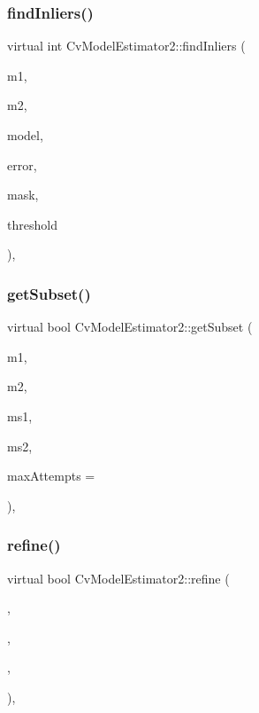 \subsubsection{find\+Inliers()}
{\footnotesize\ttfamily virtual int Cv\+Model\+Estimator2\+::find\+Inliers (\begin{DoxyParamCaption}\item[{const Cv\+Mat $\ast$}]{m1,  }\item[{const Cv\+Mat $\ast$}]{m2,  }\item[{const Cv\+Mat $\ast$}]{model,  }\item[{Cv\+Mat $\ast$}]{error,  }\item[{Cv\+Mat $\ast$}]{mask,  }\item[{double}]{threshold }\end{DoxyParamCaption})\hspace{0.3cm}{\ttfamily [protected]}, {\ttfamily [virtual]}}

\mbox{\label{class_cv_model_estimator2_a8a1749e60a02a5cb697425bd2daa35af}} 
\subsubsection{get\+Subset()}
{\footnotesize\ttfamily virtual bool Cv\+Model\+Estimator2\+::get\+Subset (\begin{DoxyParamCaption}\item[{const Cv\+Mat $\ast$}]{m1,  }\item[{const Cv\+Mat $\ast$}]{m2,  }\item[{Cv\+Mat $\ast$}]{ms1,  }\item[{Cv\+Mat $\ast$}]{ms2,  }\item[{int}]{max\+Attempts = {} }\end{DoxyParamCaption})\hspace{0.3cm}{\ttfamily [protected]}, {\ttfamily [virtual]}}

\mbox{\label{class_cv_model_estimator2_a760edefe34027333ccc6c19e74cb46d1}} 
\subsubsection{refine()}
{\footnotesize\ttfamily virtual bool Cv\+Model\+Estimator2\+::refine (\begin{DoxyParamCaption}\item[{const Cv\+Mat $\ast$}]{,  }\item[{const Cv\+Mat $\ast$}]{,  }\item[{Cv\+Mat $\ast$}]{,  }\item[{int}]{ }\end{DoxyParamCaption})\hspace{0.3cm}{\ttfamily [inline]}, {\ttfamily [virtual]}}

